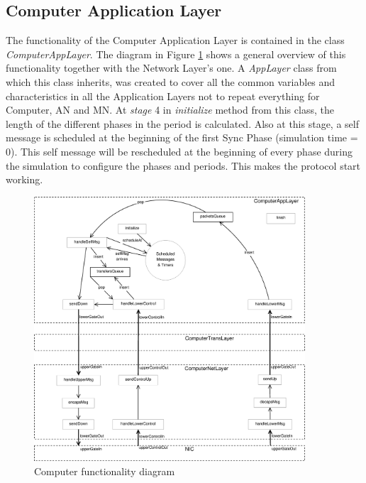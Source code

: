 \subsection{Computer Application Layer}

The functionality of the Computer Application Layer is contained in the class \textit{ComputerAppLayer}. The diagram in Figure \ref{fig:Computerschema} 
shows a general overview of this functionality together with the Network Layer's one. A \textit{AppLayer} class from which this class inherits,
was created to cover all the common variables and characteristics in all the Application Layers not to repeat everything for Computer, \ac{AN}
and \ac{MN}. At \textit{stage} 4 in \textit{initialize} method from this class, the length of the different phases in the period is calculated. 
Also at this stage, a self message is scheduled at the beginning of the first Sync Phase (simulation time = 0). This self message will be rescheduled 
at the beginning of every phase during the simulation to configure the phases and periods. This makes the protocol start working.

\begin{figure}[ht]
  \begin{center}
    \includegraphics[width=0.9\textwidth]{Computerschema.eps}
  \end{center}
  \caption{Computer functionality diagram}
  \label{fig:Computerschema}
\end{figure}

